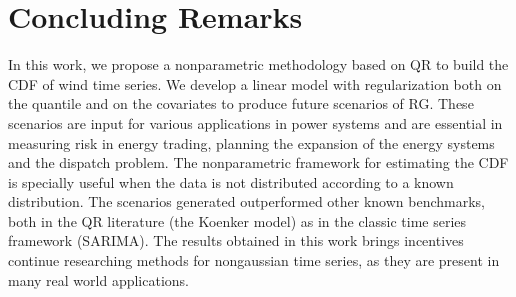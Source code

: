 \section{Concluding Remarks}

In this work, we propose a nonparametric methodology based on QR to build the CDF of wind time series.  We develop a linear model with regularization both on the quantile and on the covariates to produce future scenarios of RG. These scenarios are input for various applications in power systems and are essential in measuring risk in energy trading, planning the expansion of the energy systems and the dispatch problem. The nonparametric framework for estimating the CDF is specially useful when the data is not distributed according to a known distribution. The scenarios generated outperformed other known benchmarks, both in the QR literature (the Koenker model) as in the classic time series framework (SARIMA). The results obtained in this work brings incentives continue researching methods for nongaussian time series, as they are present in many real world applications. 